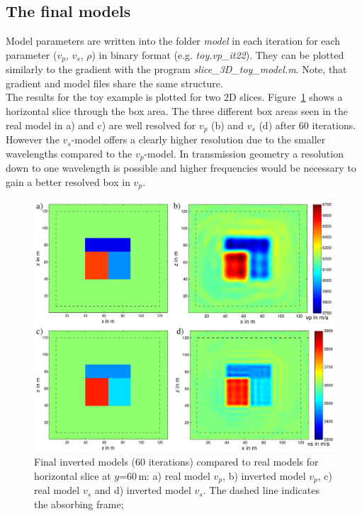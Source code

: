 \subsection{The final models}
Model parameters are written into the folder \textit{model} in each iteration for each parameter ($v_p$, $v_s$, $\rho$) in binary format (e.g. \textit{toy.vp\_it22}). They can be plotted similarly to the gradient with the program \textit{slice\_3D\_toy\_model.m}. Note, that gradient and model files share the same structure.\\
The results for the toy example is plotted for two 2D slices. Figure~\ref{fig:toy_result1} shows a horizontal slice through the box area. The three different box areas seen in the real model in a) and c) are well resolved for $v_p$ (b) and $v_s$ (d) after 60 iterations. However the $v_s$-model offers a clearly higher resolution due to the smaller wavelengths compared to the $v_p$-model. In transmission geometry a resolution down to one wavelength is possible and higher frequencies would be necessary to gain a better resolved box in $v_p$.
\begin{figure}[h!]
\begin{center}
\includegraphics[width=\textwidth]{fig_toy/toy_model_result_new}
\caption[Toy example - final inverted models, horizontal slice]{Final inverted models (60 iterations) compared to real models for horizontal slice at $y$=60\,m: a) real model $v_p$, b) inverted  model $v_p$, c) real model $v_s$ and d) inverted model $v_s$. The dashed line indicates the absorbing frame;  }\label{fig:toy_result1}
\end{center}
\end{figure}
